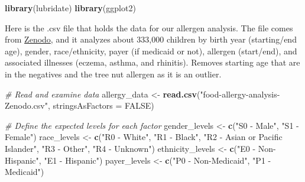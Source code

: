 \documentclass[
]{article}
\newenvironment{Shaded}{\begin{snugshade}}{\end{snugshade}}
\newcommand{\AttributeTok}[1]{\textcolor[rgb]{0.13,0.29,0.53}{#1}}
\newcommand{\CommentTok}[1]{\textcolor[rgb]{0.56,0.35,0.01}{\textit{#1}}}
\newcommand{\ConstantTok}[1]{\textcolor[rgb]{0.56,0.35,0.01}{#1}}
\newcommand{\FunctionTok}[1]{\textcolor[rgb]{0.13,0.29,0.53}{\textbf{#1}}}
\newcommand{\NormalTok}[1]{#1}
\newcommand{\OtherTok}[1]{\textcolor[rgb]{0.56,0.35,0.01}{#1}}
\newcommand{\StringTok}[1]{\textcolor[rgb]{0.31,0.60,0.02}{#1}}
\begin{document}
\begin{Shaded}
\begin{Highlighting}[]
\FunctionTok{library}\NormalTok{(lubridate)}
\FunctionTok{library}\NormalTok{(ggplot2)}
\end{Highlighting}
\end{Shaded}

Here is the .csv file that holds the data for our allergen analysis. The
file comes from \href{https://zenodo.org/records/44529}{Zenodo}, and it
analyzes about 333,000 children by birth year (starting/end age),
gender, race/ethnicity, payer (if medicaid or not), allergen
(start/end), and associated illnesses (eczema, asthma, and rhinitis).
Removes starting age that are in the negatives and the tree nut allergen
as it is an outlier.

\begin{Shaded}
\begin{Highlighting}[]
\CommentTok{\# Read and examine data}
\NormalTok{allergy\_data }\OtherTok{\textless{}{-}} \FunctionTok{read.csv}\NormalTok{(}\StringTok{"food{-}allergy{-}analysis{-}Zenodo.csv"}\NormalTok{, }\AttributeTok{stringsAsFactors =} \ConstantTok{FALSE}\NormalTok{)}

\CommentTok{\# Define the expected levels for each factor}
\NormalTok{gender\_levels }\OtherTok{\textless{}{-}} \FunctionTok{c}\NormalTok{(}\StringTok{"S0 {-} Male"}\NormalTok{, }\StringTok{"S1 {-} Female"}\NormalTok{)}
\NormalTok{race\_levels }\OtherTok{\textless{}{-}} \FunctionTok{c}\NormalTok{(}\StringTok{"R0 {-} White"}\NormalTok{, }\StringTok{"R1 {-} Black"}\NormalTok{, }\StringTok{"R2 {-} Asian or Pacific Islander"}\NormalTok{, }\StringTok{"R3 {-} Other"}\NormalTok{, }\StringTok{"R4 {-} Unknown"}\NormalTok{)}
\NormalTok{ethnicity\_levels }\OtherTok{\textless{}{-}} \FunctionTok{c}\NormalTok{(}\StringTok{"E0 {-} Non{-}Hispanic"}\NormalTok{, }\StringTok{"E1 {-} Hispanic"}\NormalTok{)}
\NormalTok{payer\_levels }\OtherTok{\textless{}{-}} \FunctionTok{c}\NormalTok{(}\StringTok{"P0 {-} Non{-}Medicaid"}\NormalTok{, }\StringTok{"P1 {-} Medicaid"}\NormalTok{)}


\end{Highlighting}
\end{Shaded}
\end{document}
